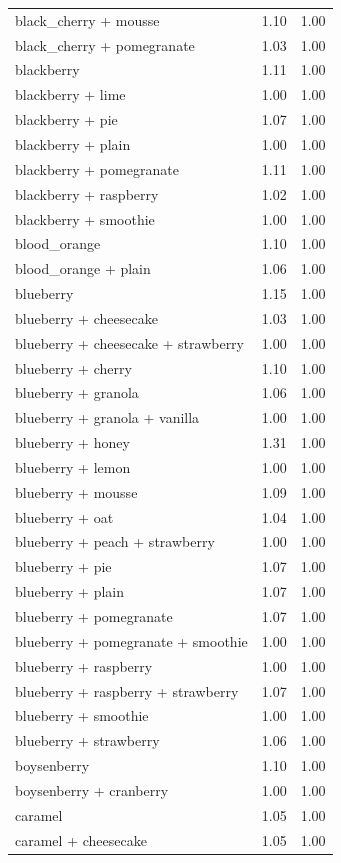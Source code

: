 \begin{table}
\begin{tabular}{lrr}
black\_cherry + mousse & 1.10 & 1.00 \\
black\_cherry + pomegranate & 1.03 & 1.00 \\
blackberry & 1.11 & 1.00 \\
blackberry + lime & 1.00 & 1.00 \\
blackberry + pie & 1.07 & 1.00 \\
blackberry + plain & 1.00 & 1.00 \\
blackberry + pomegranate & 1.11 & 1.00 \\
blackberry + raspberry & 1.02 & 1.00 \\
blackberry + smoothie & 1.00 & 1.00 \\
blood\_orange & 1.10 & 1.00 \\
blood\_orange + plain & 1.06 & 1.00 \\
blueberry & 1.15 & 1.00 \\
blueberry + cheesecake & 1.03 & 1.00 \\
blueberry + cheesecake + strawberry & 1.00 & 1.00 \\
blueberry + cherry & 1.10 & 1.00 \\
blueberry + granola & 1.06 & 1.00 \\
blueberry + granola + vanilla & 1.00 & 1.00 \\
blueberry + honey & 1.31 & 1.00 \\
blueberry + lemon & 1.00 & 1.00 \\
blueberry + mousse & 1.09 & 1.00 \\
blueberry + oat & 1.04 & 1.00 \\
blueberry + peach + strawberry & 1.00 & 1.00 \\
blueberry + pie & 1.07 & 1.00 \\
blueberry + plain & 1.07 & 1.00 \\
blueberry + pomegranate & 1.07 & 1.00 \\
blueberry + pomegranate + smoothie & 1.00 & 1.00 \\
blueberry + raspberry & 1.00 & 1.00 \\
blueberry + raspberry + strawberry & 1.07 & 1.00 \\
blueberry + smoothie & 1.00 & 1.00 \\
blueberry + strawberry & 1.06 & 1.00 \\
boysenberry & 1.10 & 1.00 \\
boysenberry + cranberry & 1.00 & 1.00 \\
caramel & 1.05 & 1.00 \\
caramel + cheesecake & 1.05 & 1.00 \\

\end{tabular}
\end{table}
